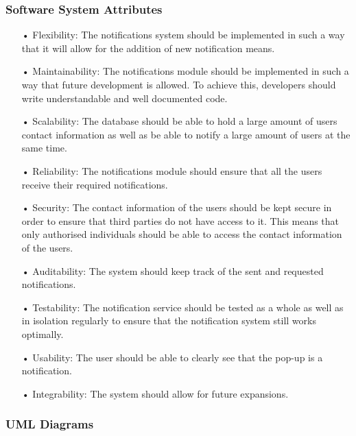 \documentclass[runningheads,a4paper]{article}
\begin{document}
\subsubsection{Software System Attributes}
\begin{enumerate}

\item[•]Flexibility: The notifications system should be implemented in such a way that it will allow for the addition of new notification means.

\item[•]Maintainability: The notifications module should be implemented in such a way that future development is allowed. To achieve this, developers should write understandable and well documented code.
 
\item[•]Scalability: The database should be able to hold a large amount of users contact information as well as be able to notify a large amount of users at the same time.

\item[•]Reliability: The notifications module should ensure that all the users receive their required notifications.

\item[•]Security: The contact information of the users should be kept secure in order to ensure that third parties do not have access to it. This means that only authorised individuals should be able to access the contact information of the users.

\item[•]Auditability: The system should keep track of the sent and requested notifications.

\item[•]Testability: The notification service should be tested as a whole as well as in isolation regularly to ensure that the notification system still works optimally.

\item[•]Usability: The user should be able to clearly see that the pop-up is a notification.

\item[•]Integrability: The system should allow for future expansions.

\end{enumerate}



\subsubsection{UML Diagrams}
\end{document}
